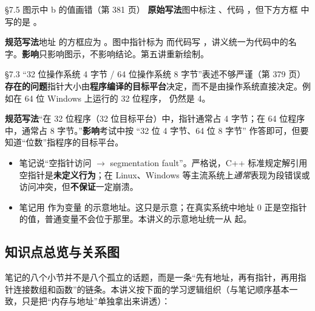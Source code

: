 \begin{correctionbox}{ §7.5 图示中 b 的值画错（第 381 页）}
\textbf{原始写法}\quad 图中标注 、代码 ，但下方方框  中写的是 。

\textbf{规范写法}\quad 地址  的方框应为 。图中指针标为  而代码写 ，讲义统一为代码中的名字。\quad\textbf{影响}\quad 只影响图示，不影响结论。第五讲重新绘制。
\end{correctionbox}

\begin{correctionbox}{ §7.3 “32 位操作系统 4 字节 / 64 位操作系统 8 字节”表述不够严谨（第 379 页）}
\textbf{存在的问题}\quad 指针大小由\textbf{程序编译的目标平台}决定，而不是由操作系统直接决定。例如在 64 位 Windows 上运行的 32 位程序， 仍然是 4。

\textbf{规范写法}\quad “在 32 位程序（32 位目标平台）中，指针通常占 4 字节；在 64 位程序中，通常占 8 字节。”\quad\textbf{影响}\quad 考试中按 “32 位 4 字节、64 位 8 字节” 作答即可，但要知道“位数”指程序的目标平台。
\end{correctionbox}

\begin{warningbox}
\begin{itemize}
  \item 笔记说“空指针访问 $\to$ segmentation fault”。严格说，C++ 标准规定解引用空指针是\textbf{未定义行为}；在 Linux、Windows 等主流系统上\emph{通常}表现为段错误或访问冲突，但\textbf{不保证}一定崩溃。
  \item 笔记用  作为变量  的示意地址。这只是示意；在真实系统中地址 0 正是空指针的值，普通变量不会位于那里。本讲义的示意地址统一从  起。
\end{itemize}
\end{warningbox}

\subsection*{知识点总览与关系图}
笔记的八个小节并不是八个孤立的话题，而是一条“先有地址，再有指针，再用指针连接数组和函数”的链条。本讲义按下面的学习逻辑组织（与笔记顺序基本一致，只是把“内存与地址”单独拿出来讲透）：

